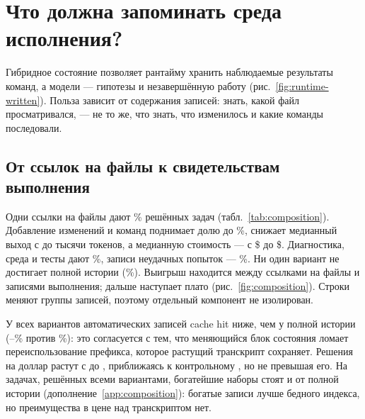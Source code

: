 \section{Что должна запоминать среда исполнения?}
\label{sec:runtime}

Гибридное состояние позволяет рантайму хранить наблюдаемые результаты
команд, а модели --- гипотезы и незавершённую работу
(рис.~\ref{fig:runtime-written}). Польза зависит от содержания записей:
знать, какой файл просматривался, --- не то же, что знать, что изменилось
и какие команды последовали.



\subsection{От ссылок на файлы к свидетельствам выполнения}

Одни ссылки на файлы дают \ExploreFilesRate\% решённых задач
(табл.~\ref{tab:composition}). Добавление изменений и команд поднимает
долю до \ExploreCommandsRate\%, снижает медианный выход с
\ExploreFilesOutputMedian{} до \ExploreCommandsOutputMedian{} тысячи
токенов, а медианную стоимость --- с \$\ExploreFilesCostMedian{} до
\$\ExploreCommandsCostMedian{}. Диагностика, среда и тесты дают
\ExploreRichRate\%, записи неудачных попыток --- \ExploreFailuresRate\%.
Ни один вариант не достигает полной истории (\ExploreControlRate\%).
Выигрыш находится между ссылками на файлы и записями выполнения; дальше
наступает плато (рис.~\ref{fig:composition}). Строки меняют группы
записей, поэтому отдельный компонент не изолирован.

\begin{table}[htbp]
\centering\small
\caption{Состав автоматических записей при одной семантической схеме
(поисковое сравнение, один повтор). Сверху --- панель качества по всем
включённым исходам, снизу --- панель ресурсов (медианы по выполнениям).
Строки с $+$ добавляют записи к предыдущей.}
\label{tab:composition}
\resizebox{\linewidth}{!}{}

\medskip
\resizebox{\linewidth}{!}{}
\end{table}



У всех вариантов автоматических записей cache hit ниже, чем у полной
истории (\ExploreCommandsCacheHitMedian--\ExploreFilesCacheHitMedian\%
против \ExploreControlCacheHitMedian\%): это согласуется с тем, что
меняющийся блок состояния ломает переиспользование префикса, которое
растущий транскрипт сохраняет. Решения на доллар растут с
\ExploreFilesSolvedPerDollar{} до \ExploreCommandsSolvedPerDollar{},
приближаясь к контрольному \ExploreControlSolvedPerDollar{}, но не
превышая его. На задачах, решённых всеми вариантами, богатейшие наборы
стоят \ExploreRichFixedCostRatio{} и \ExploreFailuresFixedCostRatio{}
от полной истории (дополнение~\ref{app:composition}): богатые записи
лучше бедного индекса, но преимущества в цене над транскриптом нет.


